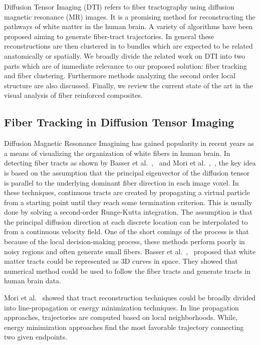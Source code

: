 Diffusion Tensor Imaging (DTI) refers to fiber tractography using diffusion  magnetic resonance (MR) images. It is a promising method for reconstructing the pathways of white matter in the human brain.
A variety of algorithms have been proposed aiming to generate fiber-tract trajectories. In general these reconstructions are then clustered in to bundles which are expected to be related anatomically or spatially. 
We broadly divide the related work on DTI into two parts which are of immediate relevance to our proposed solution: fiber tracking and fiber clustering. Furthermore methods analyzing the second order local structure are also discussed. Finally, we review the current state of the art in the visual analysis of fiber reinforced composites.

\subsection {Fiber Tracking in Diffusion Tensor Imaging}
\label{subsec:fiberEx}
Diffusion Magnetic Resonance Imagining has gained popularity in recent years as a means of visualizing the organization of white fibers in human brain.
In detecting fiber tracts as shown by Basser et al.~\cite{Basser2000},~\cite{Basser2002} and Mori et al.~\cite{Mori2002},~\cite{Mori1999}, the key idea is based on the assumption that the principal eigenvector of the diffusion tensor is parallel to the underlying dominant fiber direction in each image voxel. In these techniques, continuous tracts are created by propagating a virtual particle from a starting point until they reach some termination criterion. This is usually done by solving a second-order Runge-Kutta integration. The assumption is that the principal diffusion direction at each discrete location can be interpolated to from a continuous velocity field. One of the short comings of the process is that because of the local decision-making process, these methods perform poorly in noisy regions and often generate small fibers. Basser et al.~\cite{Basser2000},~\cite{Basser2002} proposed that white matter tracts could be represented as 3D curves in space. They showed that numerical method could be used to follow the fiber tracts and generate tracts in human brain data. 

Mori et al.~\cite{Mori2002} showed that tract reconstruction techniques could be broadly divided into line-propagation or energy minimization techniques. In line propagation approaches, trajectories are computed based on local neighborhoods. While, energy minimization approaches find the most favorable trajectory connecting two given endpoints. 

